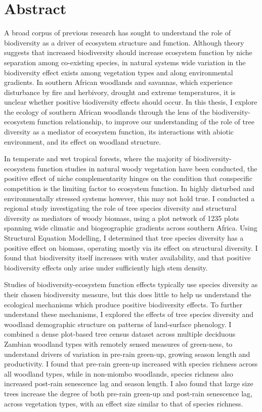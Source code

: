 \chapter*{Abstract}
\label{abstract}

A broad corpus of previous research has sought to understand the role of biodiversity as a driver of ecosystem structure and function. Although theory suggests that increased biodiversity should increase ecosystem function by niche separation among co-existing species, in natural systems wide variation in the biodiversity effect exists among vegetation types and along environmental gradients. In southern African woodlands and savannas, which experience disturbance by fire and herbivory, drought and extreme temperatures, it is unclear whether positive biodiversity effects should occur. In this thesis, I explore the ecology of southern African woodlands through the lens of the biodiversity-ecosystem function relationship, to improve our understanding of the role of tree diversity as a mediator of ecosystem function, its interactions with abiotic environment, and its effect on woodland structure. 

In temperate and wet tropical forests, where the majority of biodiversity-ecosystem function studies in natural woody vegetation have been conducted, the positive effect of niche complementarity hinges on the condition that conspecific competition is the limiting factor to ecosystem function. In highly disturbed and environmentally stressed systems however, this may not hold true. I conducted a regional study investigating the role of tree species diversity and structural diversity as mediators of woody biomass, using a plot network of 1235 plots spanning wide climatic and biogeographic gradients across southern Africa. Using Structural Equation Modelling, I determined that tree species diversity has a positive effect on biomass, operating mostly via its effect on structural diversity. I found that biodiversity itself increases with water availability, and that positive biodiversity effects only arise under sufficiently high stem density.

Studies of biodiversity-ecosystem function effects typically use species diversity as their chosen biodiversity measure, but this does little to help us understand the ecological mechanisms which produce positive biodiversity effects. To further understand these mechanisms, I explored the effects of tree species diversity and woodland demographic structure on patterns of land-surface phenology. I combined a dense plot-based tree census dataset across multiple deciduous Zambian woodland types with remotely sensed measures of green-ness, to understand drivers of variation in pre-rain green-up, growing season length and productivity. I found that pre-rain green-up increased with species richness across all woodland types, while in non-miombo woodlands, species richness also increased post-rain senescence lag and season length. I also found that large size trees increase the degree of both pre-rain green-up and post-rain senescence lag, across vegetation types, with an effect size similar to that of species richness.

